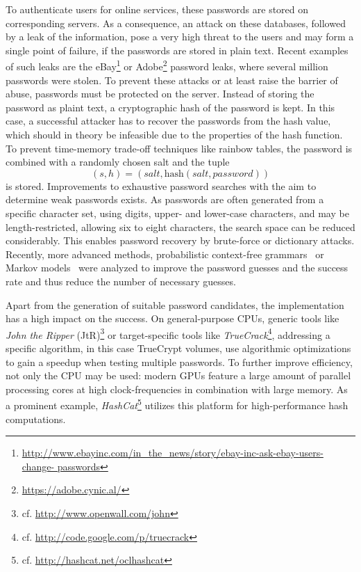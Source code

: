To authenticate users for online services, these passwords are stored on
corresponding servers. As a consequence, an attack on these databases, followed
by a leak of the information, pose a very high threat to the users and may form
a single point of failure, if the passwords are stored in plain text. Recent
examples of such leaks are the eBay\footnote{\cf
\url{http://www.ebayinc.com/in_the_news/story/ebay-inc-ask-ebay-users-change-
passwords}} or Adobe\footnote{\cf \url{https://adobe.cynic.al/}} password leaks,
where several million passwords were stolen. To prevent these attacks or at
least raise the barrier of abuse, passwords must be protected on the server.
Instead of storing the password as plaint text, a cryptographic hash of the
password is kept. In this case, a successful attacker has to recover the
passwords from the hash value, which should in theory be infeasible due to the
properties of the hash function. To prevent time-memory trade-off techniques
like rainbow tables, the password is combined with a randomly chosen salt and
the tuple
\begin{equation*}
	(s, h) = (salt, \text{hash}(salt, password))
\end{equation*}
is stored. Improvements to exhaustive password searches with the aim to
determine weak passwords exists. As passwords are often generated from a
specific character set, \eg using digits, upper- and lower-case characters, and
may be length-restricted, \eg allowing six to eight characters, the search space
can be reduced considerably. This enables password recovery by brute-force or
dictionary attacks. Recently, more advanced methods,
\eg probabilistic context-free grammars~\cite{PWDCrackGrammars} or Markov
models~\cite{FastDictAttacks,OMEN} were analyzed to improve the password guesses
and the success rate and thus reduce the number of necessary guesses.

Apart from the generation of suitable password candidates, the implementation has a
high impact on the success. On general-purpose CPUs, generic tools like
\emph{John the Ripper} (JtR)\footnote{cf. \url{http://www.openwall.com/john}} or
target-specific tools like \emph{TrueCrack}\footnote{cf.
\url{http://code.google.com/p/truecrack}}, addressing a specific algorithm, in
this case TrueCrypt volumes, use algorithmic optimizations to gain a speedup
when testing multiple passwords. To further improve efficiency, not only the CPU
may be used: modern GPUs feature a large amount of parallel processing cores at
high clock-frequencies in combination with large memory. As a prominent example,
\emph{HashCat}\footnote{cf. \url{http://hashcat.net/oclhashcat}} utilizes this
platform for high-performance hash computations.

